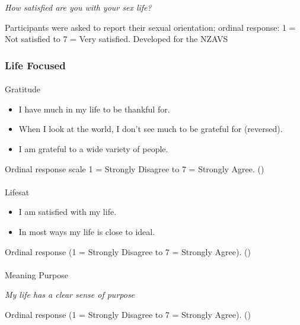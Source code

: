 \documentclass[
  single column]{article}
\makeatletter
\let\oldparagraph\paragraph
\renewcommand{\paragraph}{
    \@ifstar
      \xxxParagraphStar
      \xxxParagraphNoStar
  }
\newcommand{\xxxParagraphStar}[1]{\oldparagraph*{#1}\mbox{}}
\newcommand{\xxxParagraphNoStar}[1]{\oldparagraph{#1}\mbox{}}
\providecommand{\tightlist}{%
  \setlength{\itemsep}{0pt}\setlength{\parskip}{0pt}}\usepackage{longtable,booktabs,array}
\makeatother
\begin{document}
\emph{How satisfied are you with your sex life?}

Participants were asked to report their sexual orientation; ordinal
response: 1 = Not satisfied to 7 = Very satisfied. Developed for the
NZAVS

\subsubsection{Life Focused}\label{life-focused}

\paragraph{Gratitude}\label{gratitude-1}

\begin{itemize}
\tightlist
\item
  I have much in my life to be thankful for.
\item
  When I look at the world, I don't see much to be grateful for
  (reversed).
\item
  I am grateful to a wide variety of people.
\end{itemize}

Ordinal response scale 1 = Strongly Disagree to 7 = Strongly Agree.
()

\paragraph{Lifesat}\label{lifesat}

\begin{itemize}
\tightlist
\item
  I am satisfied with my life.
\item
  In most ways my life is close to ideal.
\end{itemize}

Ordinal response (1 = Strongly Disagree to 7 = Strongly Agree).
()

\paragraph{Meaning Purpose}\label{meaning-purpose-1}

\emph{My life has a clear sense of purpose}

Ordinal response (1 = Strongly Disagree to 7 = Strongly Agree).
()
\end{document}
